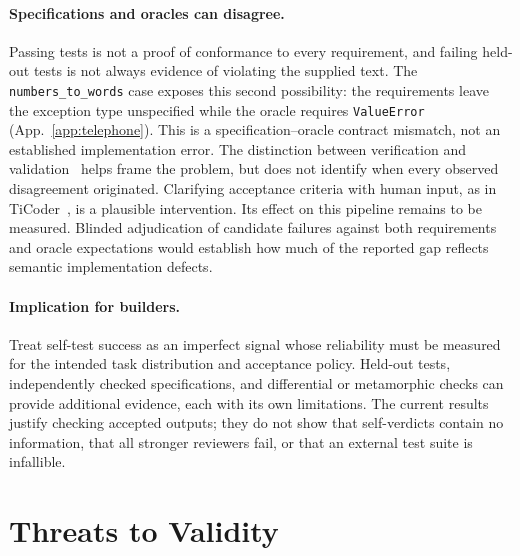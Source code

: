 \documentclass{article}
\begin{document}
\paragraph{Specifications and oracles can disagree.} Passing tests is not a proof of conformance
to every requirement, and failing held-out tests is not always evidence of violating the supplied
text. The \texttt{numbers\_to\_words} case exposes this second possibility: the requirements leave
the exception type unspecified while the oracle requires \texttt{ValueError}
(App.~\ref{app:telephone}). This is a specification--oracle contract mismatch, not an established
implementation error. The distinction between verification and validation~\cite{boehm1984vv}
helps frame the problem, but does not identify when every observed disagreement originated.
Clarifying acceptance criteria with human input, as in TiCoder~\cite{fakhoury2024ticoder}, is a
plausible intervention. Its effect on this pipeline remains to be measured. Blinded adjudication
of candidate failures against both requirements and oracle expectations would establish how
much of the reported gap reflects semantic implementation defects.

\paragraph{Implication for builders.} Treat self-test success as an imperfect signal whose
reliability must be measured for the intended task distribution and acceptance policy. Held-out
tests, independently checked specifications, and differential or metamorphic checks can provide
additional evidence, each with its own limitations. The current results justify checking
accepted outputs; they do not show that self-verdicts contain no information, that all stronger
reviewers fail, or that an external test suite is infallible.

\section{Threats to Validity}
\label{sec:threats}
\end{document}
